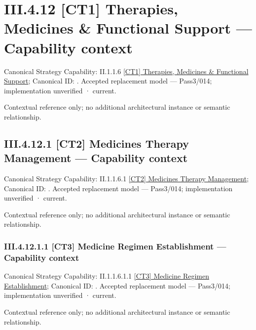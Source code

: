 \section*{III.4.12 [CT1] Therapies, Medicines \& Functional Support — Capability context}
\label{navigation:III.4.12}

{\small Canonical Strategy Capability: II.1.1.6 \hyperref[element:ef1291a271f54508aa65266f88be7e4b]{[CT1] Therapies, Medicines \& Functional Support}; Canonical ID: \texttt{}. Accepted replacement model — Pass3/014; implementation unverified · current.}\par
Contextual reference only; no additional architectural instance or semantic relationship.\par
\subsection*{III.4.12.1 [CT2] Medicines Therapy Management — Capability context}
\label{navigation:III.4.12.1}

{\small Canonical Strategy Capability: II.1.1.6.1 \hyperref[element:4c477c196e0b4afb83aabd274e2df0cb]{[CT2] Medicines Therapy Management}; Canonical ID: \texttt{}. Accepted replacement model — Pass3/014; implementation unverified · current.}\par
Contextual reference only; no additional architectural instance or semantic relationship.\par
\subsubsection*{III.4.12.1.1 [CT3] Medicine Regimen Establishment — Capability context}
\label{navigation:III.4.12.1.1}

{\small Canonical Strategy Capability: II.1.1.6.1.1 \hyperref[element:d0510b19ab734149b0f5f8b0ef16d40e]{[CT3] Medicine Regimen Establishment}; Canonical ID: \texttt{}. Accepted replacement model — Pass3/014; implementation unverified · current.}\par
Contextual reference only; no additional architectural instance or semantic relationship.\par
